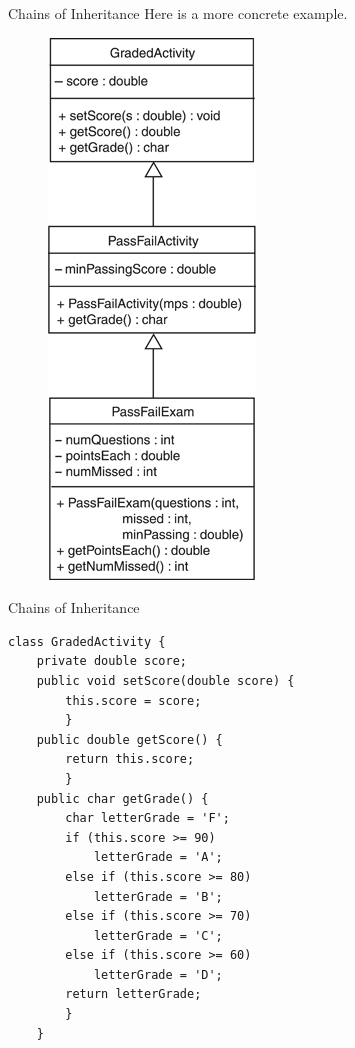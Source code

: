 \documentclass[11pt]{beamer}
\begin{document}
\begin{frame}{Chains of Inheritance}
    Here is a more concrete example.
    \noindent 
    \begin{figure}[H]
    \centering
    \includegraphics[scale=0.5]{Images/chapter10_section05_chainInheritanceConcrete.png}
    \end{figure}
\end{frame}

\begin{frame}[fragile]{Chains of Inheritance}
    \begin{lstlisting}[basicstyle=\ttfamily\footnotesize]
class GradedActivity {
    private double score;
    public void setScore(double score) {
        this.score = score;
        }
    public double getScore() {
        return this.score;
        }
    public char getGrade() {
        char letterGrade = 'F';
        if (this.score >= 90)
            letterGrade = 'A';
        else if (this.score >= 80)
            letterGrade = 'B';
        else if (this.score >= 70)
            letterGrade = 'C';
        else if (this.score >= 60)
            letterGrade = 'D';
    	return letterGrade;
    	}
    }
    \end{lstlisting}
\end{frame}
\end{document}
